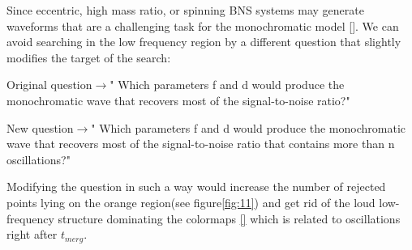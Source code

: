\FloatBarrier



Since eccentric, high mass ratio, or spinning BNS systems may generate waveforms that are a challenging task for the monochromatic model \ref{}. We can avoid searching in the low frequency region by a different question that slightly modifies the target of the search:

Original question$\rightarrow$" Which parameters f and d would produce the monochromatic wave that recovers most of the signal-to-noise ratio?"

New question$\rightarrow$" Which parameters f and d would produce the monochromatic wave that recovers most of the signal-to-noise ratio that contains more than n oscillations?"


Modifying the question in such a way would increase the number of rejected points lying on the orange region(see figure\ref{fig:11}) and get rid of the loud low-frequency structure dominating the colormaps \ref{} which is related to oscillations right after $t_{merg}$.


